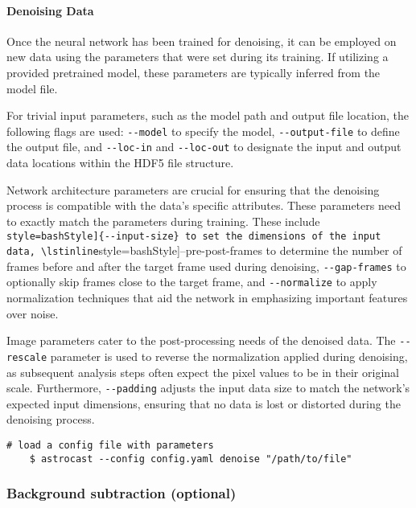 \paragraph{Denoising Data}
Once the neural network has been trained for denoising, it can be employed on new data using the parameters that were
set during its training. If utilizing a provided pretrained model, these parameters are typically inferred
from the model file.

For trivial input parameters, such as the model path and output file location, the following flags are used: \lstinline[style=bashStyle]{--model} to specify the model, \lstinline[style=bashStyle]{--output-file} to define the output file, and \lstinline[style=bashStyle]{--loc-in} and \lstinline[style=bashStyle]{--loc-out} to designate the input and output data locations within the HDF5 file structure.

Network architecture parameters are crucial for ensuring that the denoising process is compatible with the data's
specific attributes. These parameters need to exactly match the parameters during training. These include \lstinline[
    style=bashStyle]{--input-size} to set the dimensions of the input data, \lstinline[style=bashStyle]{--pre-post-frames}
to determine the number of frames before and after the target frame used during denoising, \lstinline[style=bashStyle]{--gap-frames} to optionally skip frames close to the target frame, and \lstinline[style=bashStyle]{--normalize} to apply normalization techniques that aid the network in emphasizing important features over noise.

Image parameters cater to the post-processing needs of the denoised data. The \lstinline[style=bashStyle]{--rescale}
parameter is used to reverse the normalization applied during denoising, as subsequent analysis steps often expect
the pixel values to be in their original scale. Furthermore, \lstinline[style=bashStyle]{--padding} adjusts the input
data size to match the network's expected input dimensions, ensuring that no data is lost or distorted during the
denoising process.

\begin{lstlisting}[style=bashStyle]
    # load a config file with parameters
    $ astrocast --config config.yaml denoise "/path/to/file"
\end{lstlisting}


\subsubsection{Background subtraction (optional)}

